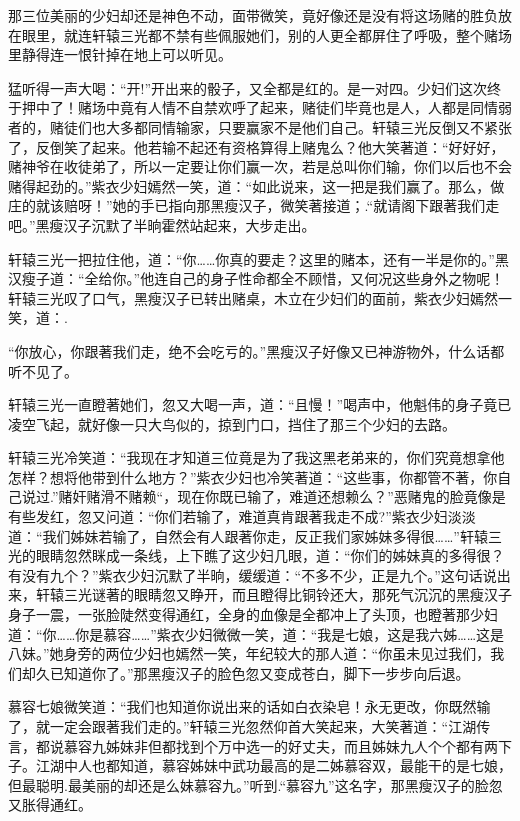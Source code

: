 \documentclass[12pt,oneside]{book}
\begin{document}
那三位美丽的少妇却还是神色不动，面带微笑，竟好像还是没有将这场赌的胜负放在眼里，就连轩辕三光都不禁有些佩服她们，别的人更全都屏住了呼吸，整个赌场里静得连一恨针掉在地上可以听见。

猛听得一声大喝：``开!''开出来的骰子，又全都是红的。是一对四。少妇们这次终于押中了！赌场中竟有人情不自禁欢呼了起来，赌徒们毕竟也是人，人都是同情弱者的，赌徒们也大多都同情输家，只要赢家不是他们自己。轩辕三光反倒又不紧张了，反倒笑了起来。他若输不起还有资格算得上赌鬼么？他大笑著道：``好好好，赌神爷在收徒弟了，所以一定要让你们赢一次，若是总叫你们输，你们以后也不会赌得起劲的。''紫衣少妇嫣然一笑，道：``如此说来，这一把是我们赢了。那么，做庄的就该赔呀！''她的手已指向那黑瘦汉子，微笑著接道；.``就请阁下跟著我们走吧。''黑瘦汉子沉默了半晌霍然站起来，大步走出。

轩辕三光一把拉住他，道：``你\ldots\ldots 你真的要走？这里的赌本，还有一半是你的。''黑汉瘦子道：``全给你。''他连自己的身子性命都全不顾惜，又何况这些身外之物呢！轩辕三光叹了口气，黑瘦汉子已转出赌桌，木立在少妇们的面前，紫衣少妇嫣然一笑，道：.

``你放心，你跟著我们走，绝不会吃亏的。''黑瘦汉子好像又已神游物外，什么话都听不见了。

轩辕三光一直瞪著她们，忽又大喝一声，道：``且慢！''喝声中，他魁伟的身子竟已凌空飞起，就好像一只大鸟似的，掠到门口，挡住了那三个少妇的去路。

轩辕三光冷笑道：``我现在才知道三位竟是为了我这黑老弟来的，你们究竟想拿他怎样？想将他带到什么地方？''紫衣少妇也冷笑著道：``这些事，你都管不著，你自己说过.''赌奸赌滑不赌赖``，现在你既已输了，难道还想赖么？''恶赌鬼的脸竟像是有些发红，忽又问道：``你们若输了，难道真肯跟著我走不成?''紫衣少妇淡淡道：``我们姊妹若输了，自然会有人跟著你走，反正我们家姊妹多得很\ldots\ldots{}''轩辕三光的眼睛忽然眯成一条线，上下瞧了这少妇几眼，道：``你们的姊妹真的多得很？有没有九个？''紫衣少妇沉默了半晌，缓缓道：``不多不少，正是九个。''这句话说出来，轩辕三光谜著的眼睛忽又睁开，而且瞪得比铜铃还大，那死气沉沉的黑瘦汉子身子一震，一张脸陡然变得通红，全身的血像是全都冲上了头顶，也瞪著那少妇道：``你\ldots\ldots 你是慕容\ldots\ldots{}''紫衣少妇微微一笑，道：``我是七娘，这是我六姊\ldots\ldots 这是八妹。''她身旁的两位少妇也嫣然一笑，年纪较大的那人道：``你虽未见过我们，我们却久已知道你了。''那黑瘦汉子的脸色忽又变成苍白，脚下一步步向后退。

慕容七娘微笑道：``我们也知道你说出来的话如白衣染皂！永无更改，你既然输了，就一定会跟著我们走的。''轩辕三光忽然仰首大笑起来，大笑著道：``江湖传言，都说慕容九姊妹非但都找到个万中选一的好丈夫，而且姊妹九人个个都有两下子。江湖中人也都知道，慕容姊妹中武功最高的是二姊慕容双，最能干的是七娘，但最聪明.最美丽的却还是么妹慕容九。''听到.``慕容九''这名字，那黑瘦汉子的脸忽又胀得通红。
\end{document}
